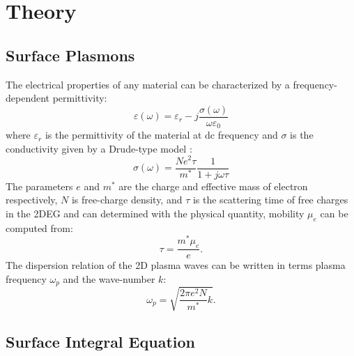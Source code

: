 \documentclass[conference, 10pt]{IEEEtran}
\renewcommand{\O}{\omega}  %
\newcommand{\E}{\varepsilon}  %
\renewcommand{\^}{\hat}  %
\begin{document}
\section{Theory}

\subsection{Surface Plasmons}
%
The electrical properties of any material can be characterized by a frequency-dependent permittivity:
%
\begin{equation}
  \E(\O)=\E_r - j\frac{\sigma(\O)}{\omega \E_0}
  \label{eq:epsilon}
\end{equation}
%
where $\E_r$ is the permittivity of the material at dc frequency and $\sigma$ is the conductivity given by a Drude-type model \cite{burke2000high}:
%
\begin{equation}
  \sigma(\O) = \frac{N e^2 \tau}{m^{\ast}}\frac{1}{1 + j \O \tau}
  \label{eq:conductivity}
\end{equation}
%
The parameters $e$ and $m^*$ are the charge and effective mass of electron respectively, $N$ is free-charge density, and $\tau$ is the scattering time of free charges in the 2DEG and can determined with the physical quantity, mobility $\mu_e$ can be computed from:
\begin{equation}
  \tau  = \frac{m^{\ast} \mu_e}{e}.
  \label{eq:tau}
\end{equation}
%
The dispersion relation of the 2D plasma waves can be written in terms plasma frequency $\O_p$ and the wave-number $k$:
%
\begin{equation}
  \O_{p} =  \sqrt{\frac{2 \pi e^2 N} {m^{\ast}} k}.
  \label{eq:N_2d}
\end{equation}
%
\subsection{Surface Integral Equation}
\end{document}
